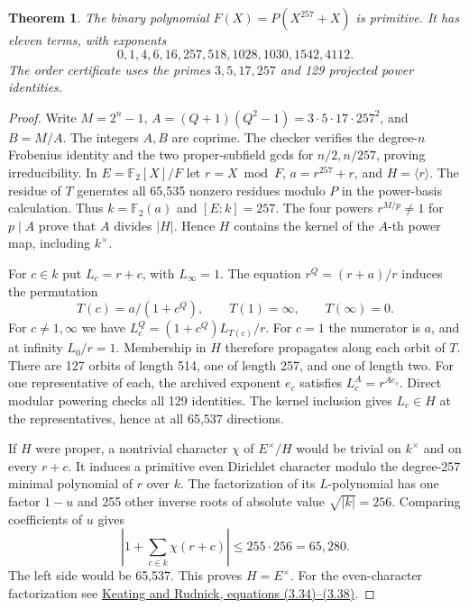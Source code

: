 \documentclass[11pt]{article}
\newtheorem{theorem}{Theorem}
\newcommand{\F}{\mathbb F_2}
\begin{document}
\begin{theorem}\label{thm:projective-4112}
The binary polynomial \(F(X)=P(X^{257}+X)\) is primitive.
It has eleven terms, with exponents
\[
  0,1,4,6,16,257,518,1028,1030,1542,4112 .
\]
The order certificate uses the primes \(3,5,17,257\) and 129
projected power identities.
\end{theorem}
\begin{proof}
Write \(M=2^n-1\), \(A=(Q+1)(Q^2-1)=3\cdot5\cdot17\cdot257^2\),
and \(B=M/A\). The integers \(A,B\) are coprime.
The checker verifies the degree-\(n\) Frobenius identity and the
two proper-subfield gcds for \(n/2,n/257\), proving irreducibility.
In \(E=\F[X]/F\) let \(r=X\bmod F\), \(a=r^{257}+r\), and
\(H=\langle r\rangle\). The residue of \(T\) generates all
65,535 nonzero residues modulo \(P\) in the power-basis calculation.
Thus \(k=\F(a)\) and \([E:k]=257\).
The four powers \(r^{M/p}\ne1\) for \(p\mid A\) prove that \(A\)
divides \(|H|\). Hence \(H\) contains the kernel of the \(A\)-th
power map, including \(k^\times\).

For \(c\in k\) put \(L_c=r+c\), with \(L_\infty=1\).
The equation \(r^Q=(r+a)/r\) induces the permutation
\[
  T(c)=a/(1+c^Q),\qquad T(1)=\infty,\qquad T(\infty)=0 .
\]
For \(c\ne1,\infty\) we have
\(L_c^Q=(1+c^Q)L_{T(c)}/r\). For \(c=1\) the numerator is \(a\),
and at infinity \(L_0/r=1\). Membership in \(H\) therefore
propagates along each orbit of \(T\).
There are 127 orbits of length 514, one of length 257, and one of
length two. For one representative of each, the archived exponent
\(e_c\) satisfies \(L_c^A=r^{A e_c}\). Direct modular powering
checks all 129 identities. The kernel inclusion gives \(L_c\in H\)
at the representatives, hence at all 65,537 directions.

If \(H\) were proper, a nontrivial character \(\chi\) of \(E^\times/H\)
would be trivial on \(k^\times\) and on every \(r+c\). It induces a
primitive even Dirichlet character modulo the degree-257 minimal
polynomial of \(r\) over \(k\). The factorization of its \(L\)-polynomial
has one factor \(1-u\) and 255 other inverse roots of absolute value
\(\sqrt{|k|}=256\). Comparing coefficients of \(u\) gives
\[
 \left|1+\sum_{c\in k}\chi(r+c)\right|\le 255\cdot256=65{,}280.
\]
The left side would be 65,537. This proves \(H=E^\times\).
For the even-character factorization see
\href{https://www.math.tau.ac.il/~rudnick/papers/KeatingRudnickIMRNfinal.pdf}
{Keating and Rudnick, equations (3.34)--(3.38)}.
\end{proof}
\end{document}
